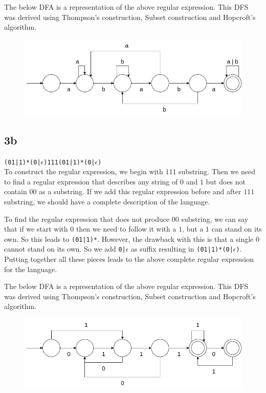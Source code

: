 \documentclass{article}
\begin{document}
    The below DFA is a representation of the above regular expression. This DFS was derived using Thompson's construction, Subset construction and Hopcroft's algorithm.

    \begin{figure}[H]
        \includegraphics[width=1\textwidth]{hw1-dfa3a.png}
    \end{figure}

    \subsection*{3b}
    \verb!(01|1)*(0|!$\epsilon$\verb!)111(01|1)*(0|!$\epsilon$\verb!)! \\

    To construct the regular expression, we begin with $111$ substring. Then we need to find a regular expression that describes any string of $0$ and $1$ but does not contain $00$ as a substring. If we add this regular expression before and after $111$ substring, we should have a complete description of the language.

    To find the regular expression that does not produce $00$ substring, we can say that if we start with $0$ then we need to follow it with a $1$, but a $1$ can stand on its own. So this leads to \verb!(01|1)*!. However, the drawback with this is that a single $0$ cannot stand on its own. So we add \verb!0|!$\epsilon$ as suffix resulting in \verb!(01|1)*(0|!$\epsilon$\verb!)!. Putting together all these pieces leads to the above complete regular expression for the language.

    The below DFA is a representation of the above regular expression. This DFS was derived using Thompson's construction, Subset construction and Hopcroft's algorithm.

    \begin{figure}[H]
        \includegraphics[width=1\textwidth]{hw1-dfa3b.png}
    \end{figure}
\end{document}
